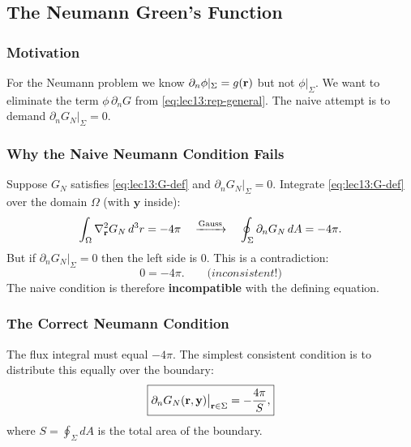 \subsection{The Neumann Green's Function}\label{subsec:lec13-neumann}

\subsubsection*{Motivation}
For the Neumann problem we know $\partial_n\phi|_\Sigma = g(\mathbf{r})$ but not $\phi|_\Sigma$.
We want to eliminate the term $\phi\,\partial_n G$ from \eqref{eq:lec13:rep-general}.
The naive attempt is to demand $\partial_n G_N|_\Sigma = 0$.

\subsubsection*{Why the Naive Neumann Condition Fails}
Suppose $G_N$ satisfies \eqref{eq:lec13:G-def} and $\partial_n G_N|_\Sigma = 0$.
Integrate \eqref{eq:lec13:G-def} over the domain $\Omega$ (with $\mathbf{y}$ inside):
\begin{equation}\label{eq:lec13:naive-inconsistency}
  \int_\Omega \nabla^2_{\mathbf{r}} G_N\, d^3r = -4\pi
  \quad\xrightarrow{\text{Gauss}}\quad
  \oint_\Sigma \partial_n G_N\, dA = -4\pi.
\end{equation}
But if $\partial_n G_N|_\Sigma = 0$ then the left side is $0$.  This is a contradiction:
\begin{equation}\label{eq:lec13:contradiction}
  0 = -4\pi. \qquad \textit{(inconsistent!)}
\end{equation}
The naive condition is therefore \textbf{incompatible} with the defining equation.

\subsubsection*{The Correct Neumann Condition}
The flux integral must equal $-4\pi$.  The simplest consistent condition is to distribute
this equally over the boundary:
\begin{equation}\label{eq:lec13:GN-condition}
  \boxed{
    \partial_n G_N(\mathbf{r},\mathbf{y})\big|_{\mathbf{r}\in\Sigma} = -\frac{4\pi}{S},
  }
\end{equation}
where $S = \oint_\Sigma dA$ is the total area of the boundary.


